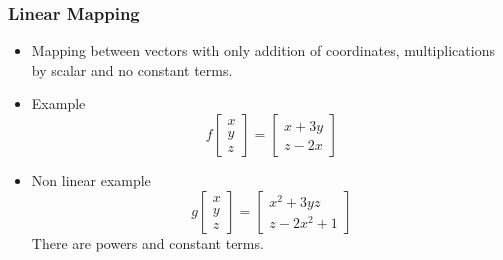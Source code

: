 \documentclass[8pt]{beamer}
\begin{document}
\begin{frame}
  \frametitle{Linear Mapping}
  \begin{itemize}
  \item Mapping between vectors with only addition of coordinates, multiplications by scalar and no constant terms.
  \item Example
    $$
    f
    \begin{bmatrix}
      x\\y\\z
    \end{bmatrix}
    =
    \begin{bmatrix}
      x+3y\\z-2x
    \end{bmatrix}
    $$
  \item Non linear example
    $$g
    \begin{bmatrix}
      x\\y\\z
    \end{bmatrix}
    =
    \begin{bmatrix}
      x^2+3yz\\z-2x^2 + 1
    \end{bmatrix}
    $$
    There are powers and constant terms.
  \end{itemize}
\end{frame}
\end{document}
